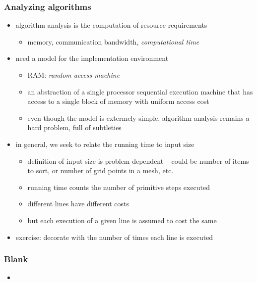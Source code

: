 \begin{frame}[fragile]
%
  \frametitle{Analyzing algorithms}
%
  \begin{itemize}
%
  \item algorithm analysis is the computation of resource requirements
    \begin{itemize}
      \item memory, communication bandwidth, {\em computational time}
    \end{itemize}
%
  \item need a model for the implementation environment
    \begin{itemize}
      \item RAM: {\em random access machine}
      \item an abstraction of a single processor sequential execution machine that has access
        to a single block of memory with uniform access cost
      \item even though the model is extermely simple, algorithm analysis remains a hard
        problem, full of subtleties
    \end{itemize}
%
    \item in general, we seek to relate the running time to input size
      \begin{itemize}
        \item definition of input size is problem dependent -- could be number of items to sort,
          or number of grid points in a mesh, etc.
        \item running time counts the number of primitive steps executed
        \item different lines have different costs
        \item but each execution of a given line is assumed to cost the same
      \end{itemize}
%
    \item exercise: decorate  with the number of times each line is
      executed
%
  \end{itemize}
%
\end{frame}

\begin{frame}[fragile]
%
  \frametitle{Blank}
%
  \begin{itemize}
  \item 
  \end{itemize}
%
\end{frame}

